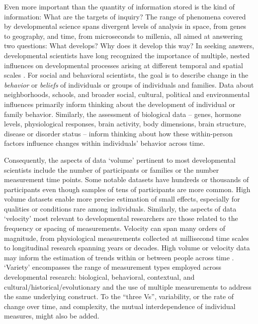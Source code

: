 \documentclass[letterpaper,man,apacite]{apa6}
\begin{document}
Even more important than the quantity of information stored is the kind of information: What are the targets of inquiry?
The range of phenomena covered by developmental science spans divergent levels of analysis in space, from genes to geography, and time, from microseconds to millenia, all aimed at answering two questions: What develops? Why does it develop this way?
In seeking answers, developmental scientists have long recognized the importance of multiple, nested influences on developmental processes arising at different temporal and spatial scales \cite{elman_rethinking_1998,gottlieb_normally_1998,oyama_ontogeny_2000,vygotsky_mind_1980}.
For social and behavioral scientists, the goal is to describe change in the \emph{behavior} or \emph{beliefs} of individuals or groups of individuals and families.
Data about neighborhoods, schools, and broader social, cultural, political and environmental influences primarily inform thinking about the development of individual or family behavior.
Similarly, the assessment of biological data -- genes, hormone levels, physiological responses, brain activity, body dimensions, brain structure, disease or disorder status -- inform thinking about how these within-person factors influence changes within individuals' behavior across time.

Consequently, the aspects of data `volume' pertinent to most developmental scientists include the number of participants or families or the number measurement time points.
Some notable datasets have hundreds or thousands of participants even though samples of tens of participants are more common.
High volume datasets enable more precise estimation of small effects, especially for qualities or conditions rare among individuals.
Similarly, the aspects of data `velocity' most relevant to developmental researchers are those related to the frequency or spacing of measurements.
Velocity can span many orders of magnitude, from physiological measurements collected at millisecond time scales to longitudinal research spanning years or decades.
High volume or velocity data may inform the estimation of trends within or between people across time \cite{rietveld_replicability_2014}.
`Variety' encompasses the range of measurement types employed across developmental research: biological, behavioral, contextual, and cultural/historical/evolutionary and the use of multiple measurements to address the same underlying construct.
To the ``three Vs'', variability, or the rate of change over time, and complexity, the mutual interdependence of individual measures, might also be added.
\end{document}
